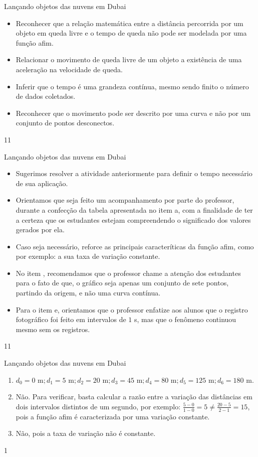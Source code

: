 \def\currentcolor{session1}
\begin{objectives}{Lançando objetos das nuvens em Dubai}
{
\begin{itemize}
\item Reconhecer que a relação matemática entre a distância percorrida por um objeto em queda livre e o tempo de queda não pode ser modelada por uma função afim.
\item Relacionar o movimento de queda livre de um objeto a existência de uma aceleração na velocidade de queda.
\item Inferir que o tempo é uma grandeza contínua, mesmo sendo finito o número de dados coletados.
\item Reconhecer que o movimento pode ser descrito por uma curva e não por um conjunto de pontos desconectos.
\end{itemize}
}{1}{1}
\end{objectives}
\begin{sugestions}{Lançando objetos das nuvens em Dubai}
{
\begin{itemize}
\item Sugerimos resolver a atividade anteriormente para definir o tempo necessário de sua aplicação.
\item Orientamos que seja feito um acompanhamento por parte do professor, durante a confecção da tabela apresentada no item a, com a finalidade de ter a certeza que os estudantes estejam compreendendo o significado dos valores gerados por ela.
\item Caso seja necessário, reforce as principais caracteríticas da função afim, como por exemplo: a sua taxa de variação constante.
\item No item , recomendamos que o professor chame a atenção dos estudantes para o fato de que, o gráfico seja apenas um conjunto de sete pontos, partindo da origem, e não uma curva contínua.
\item Para o item e, orientamos que o professor enfatize aos alunos que o registro fotográfico foi feito em intervalos de $1$ s, mas que o fenômeno continuou mesmo sem os registros.
\end{itemize}
}{1}{1}
\end{sugestions}
\clearmargin
\begin{answer}{Lançando objetos das nuvens em Dubai}
{
\begin{enumerate}
\item $d_0=0\text{ m}; d_1=5\text{ m}; d_2=20\text{ m}; d_3=45\text{ m}; d_4=80\text{ m}; d_5=125\text{ m}; d_6=180\text{ m}$.
\item Não. Para verificar, basta calcular a razão entre a variação das distâncias em dois intervalos distintos de um segundo, por exemplo: $\frac{5−0}{1−0}=5\neq\frac{20−5}{2−1}=15$, pois a função afim é caracterizada por uma variação constante.
\item Não, pois a taxa de variação não é constante.
\end{enumerate}
}{1}
\end{answer}
